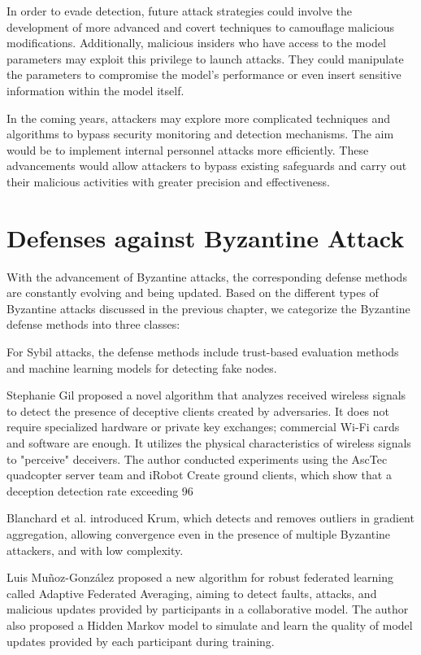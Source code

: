 \documentclass[conference]{IEEEtran}
\begin{document}
In order to evade detection, future attack strategies could involve the development of more advanced 
and covert techniques to camouflage malicious modifications. Additionally, malicious insiders who 
have access to the model parameters may exploit this privilege to launch attacks. They could
manipulate the parameters to compromise the model's performance or even insert sensitive
information within the model itself.

In the coming years, attackers may explore more complicated techniques and algorithms to 
bypass security monitoring and detection mechanisms. The aim would be to implement internal
personnel attacks more efficiently. These advancements would allow attackers to bypass 
existing safeguards and carry out their malicious activities with greater precision and 
effectiveness.


\section{Defenses against Byzantine Attack}

With the advancement of Byzantine attacks, the corresponding defense methods are constantly evolving and being updated.
Based on the different types of Byzantine attacks discussed in the previous chapter, we categorize the Byzantine defense methods into three classes:

For Sybil attacks, the defense methods include trust-based evaluation methods and machine learning models for detecting fake nodes.

Stephanie Gil \cite{b125} proposed a novel algorithm that analyzes received wireless signals to 
detect the presence of deceptive clients created by adversaries. It does not require specialized
hardware or private key exchanges; commercial Wi-Fi cards and software are enough. It utilizes 
the physical characteristics of wireless signals to "perceive" deceivers. The author conducted 
experiments using the AscTec quadcopter server team and iRobot Create ground clients, which show 
that a deception detection rate exceeding 96%


Blanchard et al. \cite{b126} introduced Krum, which detects and removes outliers in gradient aggregation, allowing convergence
even in the presence of multiple Byzantine attackers, and with low complexity.

Luis Muñoz-González \cite{b127} proposed a new algorithm for robust federated learning called 
Adaptive Federated Averaging, aiming to detect faults, attacks, and malicious updates provided 
by participants in a collaborative model. The author also proposed a Hidden Markov model to simulate
and learn the quality of model updates provided by each participant during training.
\end{document}
